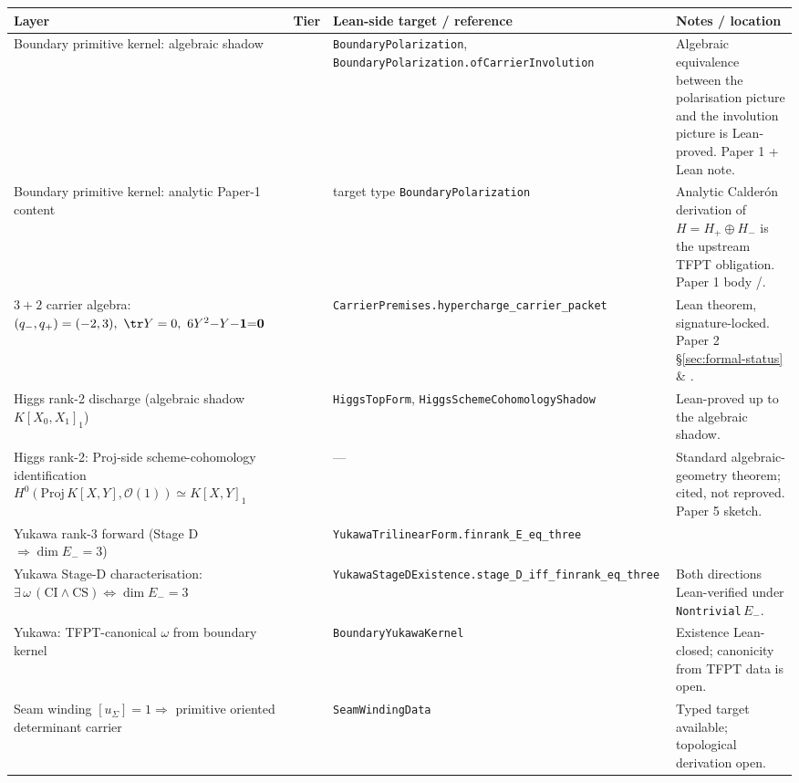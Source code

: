 \begin{center}
\footnotesize
\begin{tabularx}{\textwidth}{@{}p{}p{}p{}Y@{}}
\toprule
\textbf{Layer} & \textbf{Tier} & \textbf{Lean-side target / reference} & \textbf{Notes / location} \\
\midrule
Boundary primitive kernel: algebraic shadow
  & 
  & \texttt{BoundaryPolarization}, \texttt{BoundaryPolarization.ofCarrierInvolution}
  & Algebraic equivalence between the polarisation picture and the involution picture is Lean-proved. Paper 1 + Lean note. \\
Boundary primitive kernel: analytic Paper-1 content
  & 
  & target type \texttt{BoundaryPolarization}
  & Analytic Calder\'on derivation of $H = H_+ \oplus H_-$ is the upstream TFPT obligation. Paper 1 body /. \\
$3+2$ carrier algebra:
  $(q_-,q_+)=(-2,3),\ \tr Y=0,\ 6Y^2{-}Y{-}\mathbf 1{=}\mathbf 0$
  & 
  & \texttt{CarrierPremises.hypercharge\_carrier\_packet}
  & Lean theorem, signature-locked. Paper 2 \S\ref{sec:formal-status} \& . \\
Higgs rank-2 discharge (algebraic shadow $K[X_0,X_1]_1$)
  & 
  & \texttt{HiggsTopForm}, \texttt{HiggsSchemeCohomologyShadow}
  & Lean-proved up to the algebraic shadow. \\
Higgs rank-2: Proj-side scheme-cohomology identification
  $H^0(\mathrm{Proj}\,K[X,Y], \mathcal O(1)) \simeq K[X,Y]_1$
  & 
  & ---
  & Standard algebraic-geometry theorem; cited, not reproved. Paper 5  sketch. \\
Yukawa rank-3 forward (Stage D $\Rightarrow \dim E_-=3$)
  & 
  & \texttt{YukawaTrilinearForm.finrank\_E\_eq\_three}
  & \\
Yukawa Stage-D characterisation:
  $\exists\,\omega\,(\textrm{CI}{\wedge}\textrm{CS}) \iff \dim E_-=3$
  & 
  & \texttt{YukawaStageDExistence.stage\_D\_iff\_finrank\_eq\_three}
  & Both directions Lean-verified under \texttt{Nontrivial}\,$E_-$. \\
Yukawa: TFPT-canonical $\omega$ from boundary kernel
  & 
  & \texttt{BoundaryYukawaKernel}
  & Existence Lean-closed; canonicity from TFPT data is open. \\
Seam winding
  $[u_\Sigma]=1 \Rightarrow$ primitive oriented determinant carrier
  & 
  & \texttt{SeamWindingData}
  & Typed target available; topological derivation open. \\

\end{tabularx}
\end{center}
